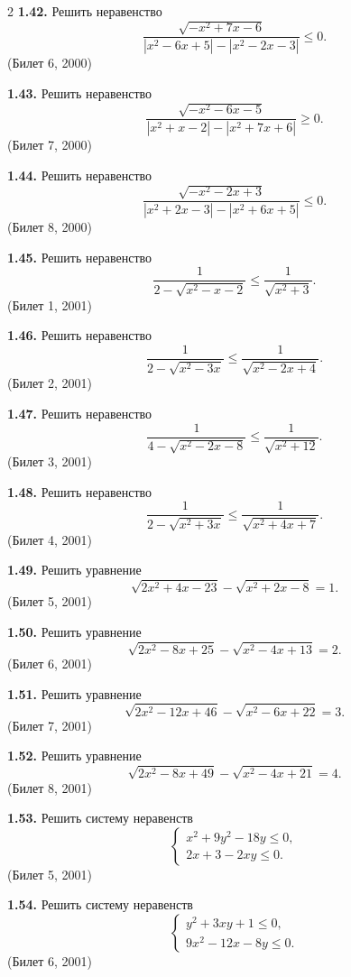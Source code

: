 \documentclass[14pt,a4paper,landscape]{extarticle}
\begin{document}
\begin{multicols}{2}
\textbf{1.42.} Решить неравенство
\[
\frac{\sqrt{-x^2 + 7x - 6}}{|x^2 - 6x + 5| - |x^2 - 2x - 3|} \leqslant 0.
\]
\hfill \textnormal{(Билет 6, 2000)}

\textbf{1.43.} Решить неравенство
\[
\frac{\sqrt{-x^2 - 6x - 5}}{|x^2 + x - 2| - |x^2 + 7x + 6|} \geqslant 0.
\]
\hfill \textnormal{(Билет 7, 2000)}

\textbf{1.44.} Решить неравенство
\[
\frac{\sqrt{-x^2 - 2x + 3}}{|x^2 + 2x - 3| - |x^2 + 6x + 5|} \leqslant 0.
\]
\hfill \textnormal{(Билет 8, 2000)}

\textbf{1.45.} Решить неравенство
\[
\frac{1}{2 - \sqrt{x^2 - x - 2}} \leqslant \frac{1}{\sqrt{x^2 + 3}}.
\]
\hfill \textnormal{(Билет 1, 2001)}

\textbf{1.46.} Решить неравенство
\[
\frac{1}{2 - \sqrt{x^2 - 3x}} \leqslant \frac{1}{\sqrt{x^2 - 2x + 4}}.
\]
\hfill \textnormal{(Билет 2, 2001)}

\textbf{1.47.} Решить неравенство
\[
\frac{1}{4 - \sqrt{x^2 - 2x - 8}} \leqslant \frac{1}{\sqrt{x^2 + 12}}.
\]
\hfill \textnormal{(Билет 3, 2001)}

\textbf{1.48.} Решить неравенство
\[
\frac{1}{2 - \sqrt{x^2 + 3x}} \leqslant \frac{1}{\sqrt{x^2 + 4x + 7}}.
\]
\hfill \textnormal{(Билет 4, 2001)}

\textbf{1.49.} Решить уравнение
\[
\sqrt{2x^2 + 4x - 23} - \sqrt{x^2 + 2x - 8} = 1.
\]
\hfill \textnormal{(Билет 5, 2001)}

\textbf{1.50.} Решить уравнение
\[
\sqrt{2x^2 - 8x + 25} - \sqrt{x^2 - 4x + 13} = 2.
\]
\hfill \textnormal{(Билет 6, 2001)}

\textbf{1.51.} Решить уравнение
\[
\sqrt{2x^2 - 12x + 46} - \sqrt{x^2 - 6x + 22} = 3.
\]
\hfill \textnormal{(Билет 7, 2001)}

\textbf{1.52.} Решить уравнение
\[
\sqrt{2x^2 - 8x + 49} - \sqrt{x^2 - 4x + 21} = 4.
\]
\hfill \textnormal{(Билет 8, 2001)}

\textbf{1.53.} Решить систему неравенств
\[
\begin{cases}
x^2 + 9y^2 - 18y \leqslant 0, \\
2x + 3 - 2xy \leqslant 0.
\end{cases}
\]
\hfill \textnormal{(Билет 5, 2001)}

\textbf{1.54.} Решить систему неравенств
\[
\begin{cases}
y^2 + 3xy + 1 \leqslant 0, \\
9x^2 - 12x - 8y \leqslant 0.
\end{cases}
\]
\hfill \textnormal{(Билет 6, 2001)}


\end{multicols}
\end{document}
